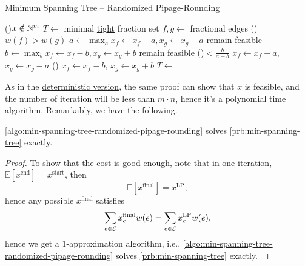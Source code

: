 \begin{algorithm}[H]\label{algo:min-spanning-tree-randomized-pipage-rounding}
	\DontPrintSemicolon
	\caption{\hyperref[prb:min-spanning-tree]{Minimum Spanning Tree} -- Randomized Pipage-Rounding}
	\BlankLine
	\While(){\(x \notin \mathbb{\MakeUppercase{n}} ^{m}\)}{
		\(T\gets\) minimal \hyperref[not:tight]{tight} fraction set
		\(f, g\gets \) fractional edges\label{algo:min-spanning-tree-randomized-pipage-rounding-fg}
		\If(){\(w(f) > w(g)\)}{
			\;
		}
		\(a\gets \max_a x_f \gets x_f + a, x_g \gets x_g - a\) remain feasible
		\(b\gets \max_b x_f \gets x_f - b, x_g \gets x_g + b\) remain feasible
		\uIf(){\(< \frac{b}{a + b}\)}{
			\(x_f \gets x_f + a\), \(x_g \gets x_g - a\)\;
		}\Else(){
			\(x_f \gets x_f - b\), \(x_g \gets x_g + b\)\;
		}
	}
	\(T\gets\)
	\;
\end{algorithm}

As in the \hyperref[algo:min-spanning-tree-pipage-rounding]{deterministic version}, the same proof can show that \(x\) is feasible, and the number of iteration will be less than \(m \cdot n\), hence it's a polynomial time algorithm. Remarkably, we have the following.

\begin{theorem}
	\autoref{algo:min-spanning-tree-randomized-pipage-rounding} solves \autoref{prb:min-spanning-tree} exactly.
\end{theorem}
\begin{proof}
	To show that the cost is good enough, note that in one iteration, \(\mathbb{E}\left[x^{\text{end} } \right] = x^{\text{start} }\), then
	\[
		\mathbb{E}\left[ x^{\text{final}} \right] = x^{\text{LP} },
	\]
	hence any possible \(x^{\text{final} }\) satisfies
	\[
		\sum_{e\in \mathcal{\MakeUppercase{e}} } x^{\text{final}}_e w(e)= \sum_{e\in \mathcal{\MakeUppercase{e}} } x_e^{\text{LP}} w(e),
	\]
	hence we get a \(1\)-approximation algorithm, i.e., \autoref{algo:min-spanning-tree-randomized-pipage-rounding} solves \autoref{prb:min-spanning-tree} exactly.
\end{proof}

